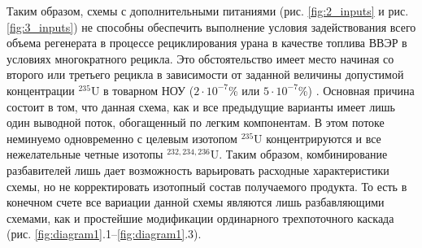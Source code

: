 Таким образом, схемы с дополнительными питаниями (рис. \ref{fig:2_inputs} и рис. \ref{fig:3_inputs}) не способны обеспечить выполнение условия задействования всего объема регенерата в процессе рециклирования урана в качестве топлива ВВЭР в условиях многократного рецикла. Это обстоятельство имеет место начиная со второго или третьего рецикла в зависимости от заданной величины допустимой концентрации $^{235}$U в товарном НОУ ($2\cdot10^{-7}$\% или $5\cdot10^{-7}$\%) \cite{smirnovEvolutionIsotopicComposition2012}. Основная причина состоит в том, что данная схема, как и все предыдущие варианты имеет лишь один выводной поток, обогащенный по легким компонентам. В этом потоке неминуемо одновременно с целевым изотопом  $^{235}$U концентрируются и все нежелательные четные изотопы $^{232,234,236}$U. Таким образом, комбинирование разбавителей лишь дает возможность варьировать расходные характеристики схемы, но не корректировать изотопный состав получаемого продукта. То есть в конечном счете все вариации данной схемы являются лишь разбавляющими схемами, как и простейшие модификации ординарного трехпоточного каскада (рис. \ref{fig:diagram1}.1--\ref{fig:diagram1}.3).





